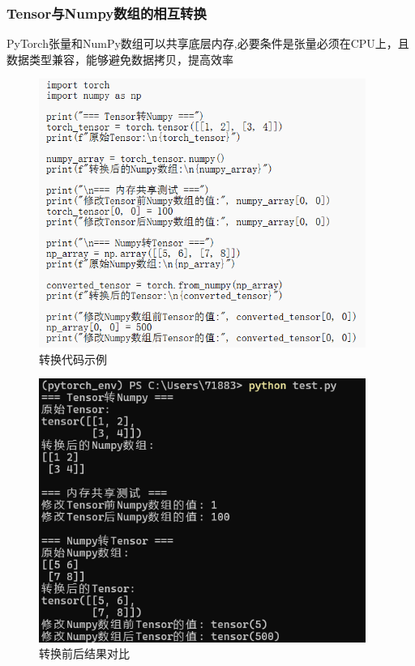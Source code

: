 \documentclass[UTF8]{ctexart}
\begin{document}
\subsubsection{Tensor与Numpy数组的相互转换}
PyTorch张量和NumPy数组可以共享底层内存,必要条件是张量必须在CPU上，且数据类型兼容，能够避免数据拷贝，提高效率
\begin{figure}[H]
    \centering
    \includegraphics[width=0.95\textwidth]{picture/Tensor与Numpy数组的相互转换.png}%
    \caption{转换代码示例}
\end{figure}
 \begin{figure}[H]
    \centering
    \includegraphics[width=0.95\textwidth]{picture/Tensor与Numpy数组的相互转换前后比对结果.png}%
    \caption{转换前后结果对比}
\end{figure}
\end{document}
